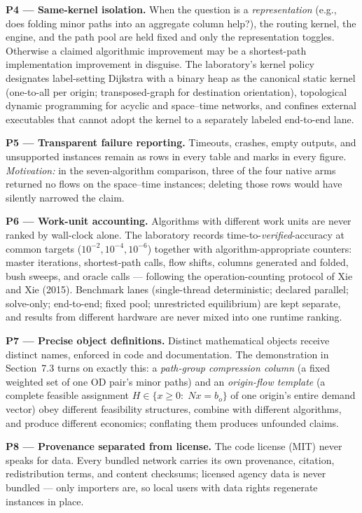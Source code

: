 \documentclass[11pt]{article}
\begin{document}
\textbf{P4 --- Same-kernel isolation.} When the question is a
\emph{representation} (e.g., does folding minor paths into an aggregate
column help?), the routing kernel, the engine, and the path pool are held
fixed and only the representation toggles. Otherwise a claimed algorithmic
improvement may be a shortest-path implementation improvement in disguise.
The laboratory's kernel policy designates label-setting Dijkstra with a
binary heap as the canonical static kernel (one-to-all per origin;
transposed-graph for destination orientation), topological dynamic
programming for acyclic and space--time networks, and confines external
executables that cannot adopt the kernel to a separately labeled
end-to-end lane.

\textbf{P5 --- Transparent failure reporting.} Timeouts, crashes, empty
outputs, and unsupported instances remain as rows in every table and marks
in every figure. \emph{Motivation:} in the seven-algorithm comparison,
three of the four native arms returned no flows on the space--time
instances; deleting those rows would have silently narrowed the claim.

\textbf{P6 --- Work-unit accounting.} Algorithms with different work units
are never ranked by wall-clock alone. The laboratory records
time-to-\emph{verified}-accuracy at common targets ($10^{-2}, 10^{-4},
10^{-6}$) together with algorithm-appropriate counters: master iterations,
shortest-path calls, flow shifts, columns generated and folded, bush sweeps,
and oracle calls --- following the operation-counting protocol of Xie and
Xie (2015). Benchmark lanes (single-thread deterministic; declared
parallel; solve-only; end-to-end; fixed pool; unrestricted equilibrium) are
kept separate, and results from different hardware are never mixed into one
runtime ranking.

\textbf{P7 --- Precise object definitions.} Distinct mathematical objects
receive distinct names, enforced in code and documentation. The
demonstration in Section~7.3 turns on exactly this: a \emph{path-group
compression column} (a fixed weighted set of one OD pair's minor paths) and
an \emph{origin-flow template} (a complete feasible assignment
$H\in\{x\ge0:\;Nx=b_o\}$ of one origin's entire demand vector) obey
different feasibility structures, combine with different algorithms, and
produce different economics; conflating them produces unfounded claims.

\textbf{P8 --- Provenance separated from license.} The code license (MIT)
never speaks for data. Every bundled network carries its own provenance,
citation, redistribution terms, and content checksums; licensed agency data
is never bundled --- only importers are, so local users with data rights
regenerate instances in place.
\end{document}
